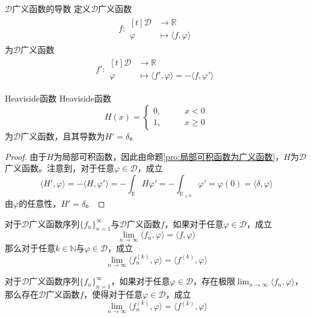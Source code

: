\documentclass[lang = cn, scheme = chinese, thmcnt = section]{elegantbook}
\newcommand{\N}{\mathbb{N}}            %
\newcommand{\R}{\mathbb{R}}            %
\newcommand{\rang}{\rangle}            %
\newcommand{\dis}{\displaystyle}
\begin{document}
\begin{definition}{$\mathscr{D}$广义函数的导数}
	定义$\mathscr{D}$广义函数
	\begin{align*}
		f:\begin{aligned}[t]
			\mathscr{D} &\longrightarrow \R\\
			\varphi &\longmapsto \langle f,\varphi \rangle
		\end{aligned}
	\end{align*}
	为$\mathscr{D}$广义函数
	\begin{align*}
		f':\begin{aligned}[t]
			\mathscr{D} &\longrightarrow \R\\
			\varphi &\longmapsto \langle f',\varphi \rangle=-\langle f,\varphi' \rangle
		\end{aligned}
	\end{align*}
\end{definition}

\begin{proposition}{Heaviside函数}
	Heaviside函数%
	$$
	H(x)=\begin{cases}
		0,\qquad & x<0\\
		1,\qquad & x\ge 0
	\end{cases}
	$$
	为$\mathscr{D}$广义函数，且其导数为$H'=\delta$。
\end{proposition}

\begin{proof}
	由于$H$为局部可积函数，因此由命题\ref{pro:局部可积函数为广义函数}，$H$为$\mathscr{D}$广义函数。注意到，对于任意$\varphi\in \mathscr{D}$，成立%
	$$
	\langle H',\varphi \rangle
	=-\langle H,\varphi' \rangle
	=-\int_{\R}H\varphi'
	=-\int_{\R_{\ge 0}}\varphi'
	=\varphi(0)
	=\langle \delta,\varphi \rangle
	$$
	由$\varphi$的任意性，$H'=\delta$。
\end{proof}

\begin{theorem}
	对于$\mathscr{D}$广义函数序列$\{ f_n \}_{n=1}^{\infty}$与$\mathscr{D}$广义函数$f$，如果对于任意$\varphi\in\mathscr{D}$，成立%
	$$
	\lim_{n\to\infty}\langle f_n,\varphi \rang
	=\langle f,\varphi \rang
	$$
	那么对于任意$k\in\N$与$\varphi\in\mathscr{D}$，成立%
	$$
	\lim_{n\to\infty}\langle f_n^{(k)},\varphi \rang
	=\langle f^{(k)},\varphi \rang
	$$
\end{theorem}

\begin{theorem}
	对于$\mathscr{D}$广义函数序列$\{ f_n \}_{n=1}^{\infty}$，如果对于任意$\varphi\in\mathscr{D}$，存在极限$\dis\lim_{n\to\infty}\langle f_n,\varphi \rang$，那么存在$\mathscr{D}$广义函数$f$，使得对于任意$\varphi\in\mathscr{D}$，成立%
	$$
	\lim_{n\to\infty}\langle f_n^{(k)},\varphi \rang
	=\langle f^{(k)},\varphi \rang
	$$
\end{theorem}
\end{document}
